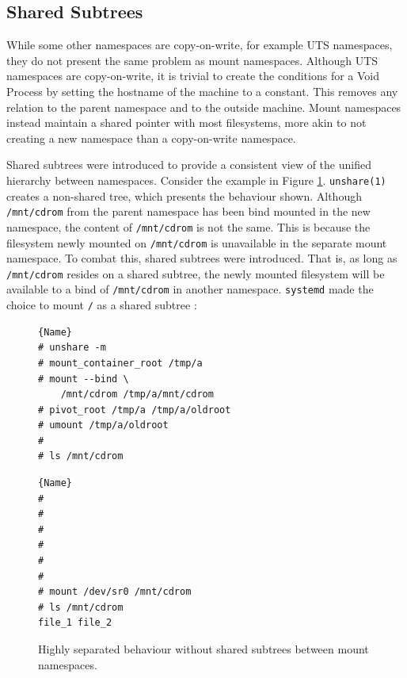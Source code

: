 \documentclass[12pt,a4paper,twoside]{report}
\begin{document}
\subsection{Shared Subtrees}

While some other namespaces are copy-on-write, for example UTS namespaces, they do not present the same problem as mount namespaces. Although UTS namespaces are copy-on-write, it is trivial to create the conditions for a Void Process by setting the hostname of the machine to a constant. This removes any relation to the parent namespace and to the outside machine. Mount namespaces instead maintain a shared pointer with most filesystems, more akin to not creating a new namespace than a copy-on-write namespace.

Shared subtrees \citep{pai_shared_2005} were introduced to provide a consistent view of the unified hierarchy between namespaces. Consider the example in Figure \ref{fig:shared-subtrees}. \texttt{unshare(1)} creates a non-shared tree, which presents the behaviour shown. Although \texttt{/mnt/cdrom} from the parent namespace has been bind mounted in the new namespace, the content of \texttt{/mnt/cdrom} is not the same. This is because the filesystem newly mounted on \texttt{/mnt/cdrom} is unavailable in the separate mount namespace. To combat this, shared subtrees were introduced. That is, as long as \texttt{/mnt/cdrom} resides on a shared subtree, the newly mounted filesystem will be available to a bind of \texttt{/mnt/cdrom} in another namespace. \texttt{systemd} made the choice to mount \texttt{/} as a shared subtree \citep{free_software_foundation_mount_namespaces7_2021}:

\begin{figure}
\begin{minipage}{.45\textwidth}

\begin{lstlisting}[frame=tlrb,showlines=true]{Name}
# unshare -m
# mount_container_root /tmp/a
# mount --bind \
    /mnt/cdrom /tmp/a/mnt/cdrom
# pivot_root /tmp/a /tmp/a/oldroot
# umount /tmp/a/oldroot
#
# ls /mnt/cdrom

\end{lstlisting}

\end{minipage}\hfill
\begin{minipage}{.45\textwidth}

\begin{lstlisting}[frame=tlrb]{Name}
#
#
#
#
#
#
# mount /dev/sr0 /mnt/cdrom
# ls /mnt/cdrom
file_1 file_2
\end{lstlisting}

\end{minipage}

\caption{Highly separated behaviour without shared subtrees between mount namespaces.}
\label{fig:shared-subtrees}
\end{figure}
\end{document}
